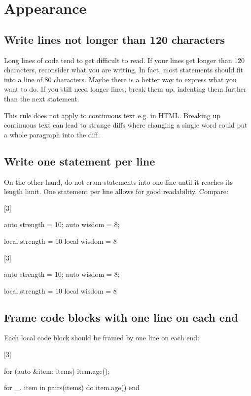 \documentclass[a4paper,11pt]{scrreprt}
\newcommand{\marginMarker}[1]{%
\marginnote{%
    \hfill%
		\Huge{#1}%
}[3\baselineskip]%
}
\newcommand{\conforming}{%
\marginMarker{\textcolor{green}{\ding{51}}}%
}
\newcommand{\nonconforming}{%
\marginMarker{\textcolor{red}{\ding{55}}}%
}
\begin{document}
\chapter{Appearance}
\section{Write lines not longer than 120 characters}
Long lines of code tend to get difficult to read. If your lines get longer than 120 characters, reconsider what you are writing. In fact, most statements should fit into a line of 80 characters. Maybe there is a better way to express what you want to do. If you still need longer lines, break them up, indenting them further than the next statement.

This rule does not apply to continuous text e.g. in HTML. Breaking up continuous text can lead to strange diffs where changing a single word could put a whole paragraph into the diff.

\section{Write one statement per line}
On the other hand, do not cram statements into one line until it reaches its length limit. One statement per line allows for good readability. Compare:

\conforming{}
\begin{cppBox}
auto strength = 10;
auto wisdom = 8;
\end{cppBox}
\begin{luaBox}
local strength = 10
local wisdom = 8
\end{luaBox}

\nonconforming{}
\begin{cppBox}
auto strength = 10; auto wisdom = 8;
\end{cppBox}
\begin{luaBox}
local strength = 10 local wisdom = 8
\end{luaBox}

\section{Frame code blocks with one line on each end}
Each local code block should be framed by one line on each end:

\conforming{}
\begin{cppBox}
for (auto &item: items) {
    item.age();
}
\end{cppBox}
\begin{luaBox}
for _, item in pairs(items) do
    item.age()
end
\end{luaBox}
\end{document}
